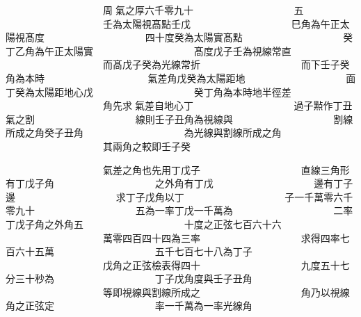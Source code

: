 \begin{正文}
　　　　　　　　　　周𫎇氣之厚六千零九十
　　　　　　　　　　五
　　　　　　　　　　壬為太陽視髙點壬戊
　　　　　　　　　　巳角為午正太陽視髙度
　　　　　　　　　　四十度癸為太陽實髙點
　　　　　　　　　　癸丁乙角為午正太陽實
　　　　　　　　　　髙度戊子壬為視線常直
　　　　　　　　　　而髙戊子癸為光線常折
　　　　　　　　　　而下壬子癸角為本時𫎇
　　　　　　　　　　氣差角戊癸為太陽距地
　　　　　　　　　　面丁癸為太陽距地心戊
　　　　　　　　　　癸丁角為本時地半徑差
　　　　　　　　　　角先求𫎇氣差自地心丁
　　　　　　　　　　過子㸃作丁丑𫎇氣之割
　　　　　　　　　　線則壬子丑角為視線與
　　　　　　　　　　割線所成之角癸子丑角
　　　　　　　　　　為光線與割線所成之角
　　　　　　　　　　其兩角之較即壬子癸𫎇
\par
\end{正文}\clearpage
{}
\begin{正文}
　　　　　　　　　　氣差之角也先用丁戊子
　　　　　　　　　　直線三角形有丁戊子角
　　　　　　　　　　之外角有丁戊
　　　　　　　　　　邊有丁子邊
　　　　　　　　　　求丁子戊角以丁
　　　　　　　　　　子一千萬零六千零九十
　　　　　　　　　　五為一率丁戊一千萬為
　　　　　　　　　　二率丁戊子角之外角五
　　　　　　　　　　十度之正弦七百六十六
　　　　　　　　　　萬零四百四十四為三率
　　　　　　　　　　求得四率七百六十五萬
　　　　　　　　　　五千七百七十八為丁子
　　　　　　　　　　戊角之正弦檢表得四十
　　　　　　　　　　九度五十七分三十秒為
　　　　　　　　　　丁子戊角度與壬子丑角
　　　　　　　　　　等即視線與割線所成之
　　　　　　　　　　角乃以視線角之正弦定
　　　　　　　　　　率一千萬為一率光線角
\par
\end{正文}\clearpage
{}
